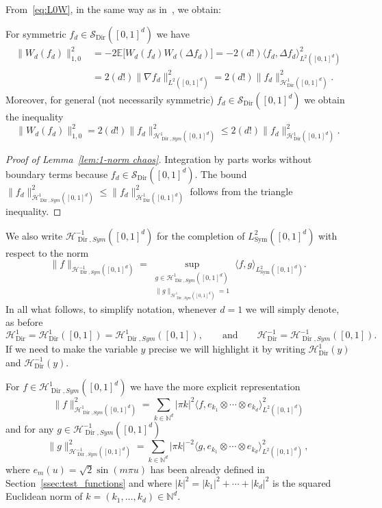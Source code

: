 \documentclass[AHL,Unicode,longabstracts]{cedram}
\DeclareMathOperator{\Dir}{Dir}
\DeclareMathOperator{\Sym}{Sym}
\newcommand{\bb}[1]{{\mathbb #1}}
\newcommand{\mc}[1]{{\mathcal #1}}
\renewcommand{\mc}[1]{{\mathcal #1}}
\newcommand{\SD}{\ensuremath{\mc S_{\Dir}}}
\renewcommand{\leq}{\leqslant}
\begin{document}
From~\eqref{eq:L0W}, in the same way as in~\cite[Lemma~3.13]{Gubinelli2015Energy}, we obtain:

\begin{lemm}\label{lem:1-norm chaos}
For symmetric $f_d \in \SD ([0, 1]^d)$ we have
\begin{align*}
\big\| W_d (f_d) \big\|_{1,0}^2 & = - 2\mathbb{E} \big[W_d (f_d) W_d (\Delta f_d)\big] = - 2 (d!) \big\langle f_d, \Delta f_d \big\rangle_{L^2([0,1]^d)}^2\\
& = 2 (d!) \big\| \nabla f_d \big\|_{L^2([0,1]^d)}^2 = 2 (d!) \big\| f_d \big\|_{\mc H_{\Dir}^1 ([0, 1]^d)}^2.
\end{align*}
Moreover, for general (not necessarily symmetric) $f_d \in \SD ([0, 1]^d)$ we obtain the inequality
\[
\big\| W_d (f_d)\big\|_{1,0}^2 = 2(d!) \big\| f_d \big\|_{\mc H_{\Dir, Sym}^1 ([0, 1]^d)}^2 \leq 2 (d!) \big\| f_d \big\|_{\mc H_{\Dir}^1 ([0, 1]^d)}^2.
\]
\end{lemm}

\begin{proof}[Proof of Lemma~\ref{lem:1-norm chaos}]
Integration by parts works without boundary terms because $f_d \in \SD ([0, 1]^d)$. The bound $\| f_d \|_{\mc H_{\Dir, Sym}^1 ([0, 1]^d)}^2 \leq \| f_d \|_{\mc H_{\Dir}^1 ([0, 1]^d)}^2$ follows from the triangle inequality.
\end{proof}%

We also write $\mc H_{\Dir, Sym}^{-1} ([0, 1]^d)$ for the completion of $L^2_{\Sym} ([0, 1]^d)$ with respect to the norm
\begin{equation}\label{eq:H0s-var-def}
\| f \|_{\mc H_{\Dir, Sym}^{-1} ([0, 1]^d)} = \sup_{\substack{ g \in \mc H_{\Dir, Sym}^{1} ([0, 1]^d)\\
\| g \|_{\mc H_{\Dir, Sym}^{1} ([0, 1]^d)} = 1}} \big\langle f, g \big\rangle_{L^2_{\Sym} ([0, 1]^d)}.
\end{equation}
In all what follows, to simplify notation, whenever $d=1$ we will simply denote, as before
\[
\mc H_{\Dir}^{1}=\mc H_{\Dir}^{1} ([0, 1])=\mc H_{\Dir, Sym}^{1} ([0, 1]), \qquad \text{and}\qquad \mc H_{\Dir}^{-1}=\mc H_{\Dir, Sym}^{-1} ([0, 1]).
\]
If we need to make the variable $y$ precise we will highlight it by writing $\mc H_{\Dir}^{1}(y)$ and $\mc H_{\Dir}^{-1}(y)$.


\begin{lemm}\label{lem:explicit-norms}
For $f \in \mc H_{\Dir, Sym}^1 ([0, 1]^d)$ we have the more explicit representation
\[
\| f \|_{\mc H_{\Dir, Sym}^1 ([0, 1]^d)}^2 = \sum_{k \in \mathbb{N}^d} | \pi k |^2 \big\langle f, e_{k_1} \otimes \cdots \otimes e_{k_d} \big\rangle_{L^2([0,1]^d)}^2
\]
and for any $g \in \mc H_{\Dir, Sym}^{-1} ([0, 1]^d)$
\[
\| g \|_{\mc H_{\Dir, Sym}^{-1} ([0, 1]^d)}^2 = \sum_{k \in \mathbb{N}^d}|
\pi k |^{- 2} \big\langle g,e_{k_1} \otimes \cdots \otimes e_{k_d} \big\rangle_{L^2([0,1]^d)}^2\,,
\]
where $e_m(u)=\sqrt 2\sin(m\pi u)$ has been already defined in Section~\ref{ssec:test_functions} and where $|k|^2 = |k_1|^2 + \cdots + |k_d|^2$ is the squared Euclidean norm of $k=(k_1,\dots,k_d) \in \bb N^d$.
\end{lemm}
\end{document}
